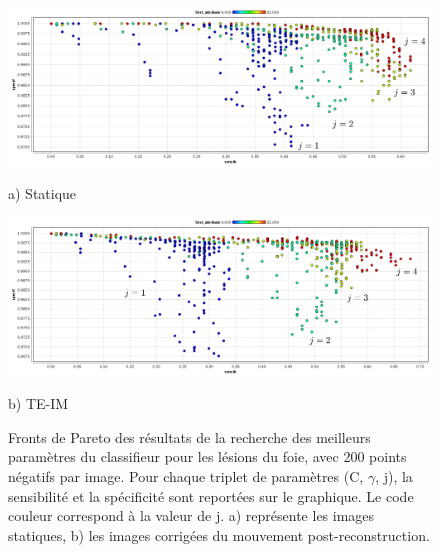 \begin{figure}[h!]

\begin{center}
 \includegraphics[width=14cm]{images/pareto_mod_Static19}

{\small a) Statique}
\vspace{0.5cm}

 \includegraphics[width=14cm]{images/pareto_mod_IM19}

{\small b) TE-IM}

\end{center}
 \caption[(1/2) Fronts de Pareto des résultats de la recherche des meilleurs paramètres du classifieur pour les lésions du foie]{Fronts de Pareto des résultats de la recherche des meilleurs paramètres du classifieur pour les lésions du foie, avec 200 points négatifs par image. Pour chaque triplet de paramètres (C, $\gamma$, j), la sensibilité et la spécificité sont reportées sur le graphique. Le code couleur correspond à la valeur de j. a) représente les images statiques, b) les images corrigées du mouvement post-reconstruction.}
\label{fig:paretoModalite19_1}
\end{figure}

